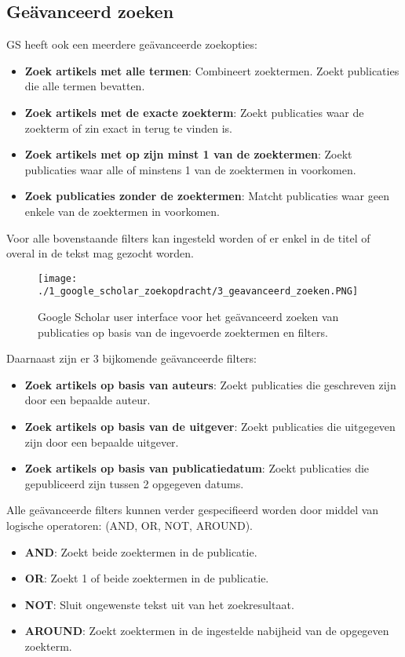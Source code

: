 \subsection{Geävanceerd zoeken}
GS heeft ook een meerdere geävanceerde zoekopties:
\begin{itemize}
    \item \textbf{Zoek artikels met alle termen}: Combineert zoektermen. Zoekt publicaties die alle termen bevatten.
    \item \textbf{Zoek artikels met de exacte zoekterm}: Zoekt publicaties waar de zoekterm of zin exact in terug te vinden is.
    \item \textbf{Zoek artikels met op zijn minst 1 van de zoektermen}: Zoekt publicaties waar alle of minstens 1 van de zoektermen in voorkomen.
    \item \textbf{Zoek publicaties zonder de zoektermen}: Matcht publicaties waar geen enkele van de zoektermen in voorkomen.
\end{itemize}
Voor alle bovenstaande filters kan ingesteld worden of er enkel in de titel of overal in de tekst mag gezocht worden.

\begin{figure}
    \centering
    \texttt{[image: ./1\_google\_scholar\_zoekopdracht/3\_geavanceerd\_zoeken.PNG]}
    \caption[Google Scholar geävanceerd zoeken.]{\label{fig:Google Scholar geävanceerd zoek}Google Scholar user interface voor het geävanceerd zoeken van publicaties op basis van de ingevoerde zoektermen en filters.}
\end{figure}

\linebreak
Daarnaast zijn er 3 bijkomende geävanceerde filters:
\begin{itemize}
    \item \textbf{Zoek artikels op basis van auteurs}: Zoekt publicaties die geschreven zijn door een bepaalde auteur.
    \item \textbf{Zoek artikels op basis van de uitgever}: Zoekt publicaties die uitgegeven zijn door een bepaalde uitgever.
    \item \textbf{Zoek artikels op basis van publicatiedatum}: Zoekt publicaties die gepubliceerd zijn tussen 2 opgegeven datums.
\end{itemize}

Alle geävanceerde filters kunnen verder gespecifieerd worden door middel van logische operatoren: (AND, OR, NOT, AROUND).
\begin{itemize}
    \item \textbf{AND}: Zoekt beide zoektermen in de publicatie.
    \item \textbf{OR}: Zoekt 1 of beide zoektermen in de publicatie.
    \item \textbf{NOT}: Sluit ongewenste tekst uit van het zoekresultaat.
    \item \textbf{AROUND}: Zoekt zoektermen in de ingestelde nabijheid van de opgegeven zoekterm.
\end{itemize}

